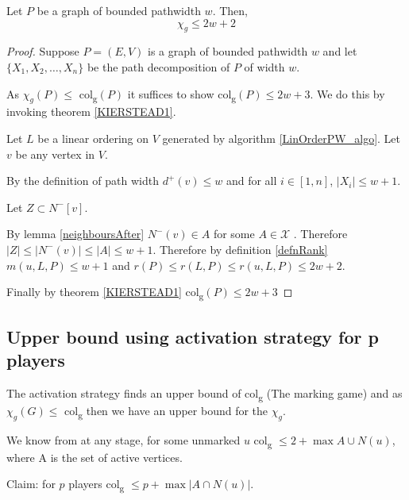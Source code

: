 \begin{theorem}
    Let $P$ be a graph of bounded pathwidth $w$. Then, 
    \[\chi_g \leq 2w + 2\]
    
\end{theorem}
\begin{proof}
    Suppose $P=(E,V)$ is a graph of bounded pathwidth $w$ and let $\{X_1,X_2,\dots,X_n\}$ be the path decomposition of $P$ of width $w$.
    
    As $\chi_g(P) \leq$ col\textsubscript{g}$(P)$ it suffices to show col\textsubscript{g}$(P) \leq 2w + 3$. We do this by invoking theorem \ref{KIERSTEAD1}.
        
    Let $L$ be a linear ordering on $V$ generated by algorithm \ref*{LinOrderPW_algo}. 
    Let $v$ be any vertex in $V$. 
    
    By the definition of path width $d^+(v) \leq w$ and for all $i \in [1,n]$, $ \left| X_i \right| \leq w + 1 $. 

    Let $Z\subset N^-[v]$.
    
    By lemma \ref{neighboursAfter} $N^-(v) \in A$ for some $A \in \mathcal{X}$ . Therefore$\left| Z\right| \leq \left| N^-(v)\right| \leq |A| \leq w+1$. Therefore by definition \ref{defnRank} $m(u,L,P) \leq w+1$ and $r(P) \leq r(L,P) \leq r(u,L,P) \leq 2w+2$. 
    
    Finally by theorem \ref{KIERSTEAD1} col\textsubscript{g}$(P) \leq 2w + 3$
    
\end{proof}

\subsection{Upper bound using activation strategy for p players}

The activation strategy finds an upper bound of col\textsubscript{g} (The marking game) and as $\chi_g(G) \leq$ col\textsubscript{g} then we have an upper bound for the $\chi_g$. 

We know from \cite{Zhu2008} at any stage, for some unmarked $u$ col\textsubscript{g} $\leq 2 + \max{A \cup N(u)}$, where A is the set of active vertices.

Claim: for $p$ players col\textsubscript{g} $\leq p + \max{ \left| A \cap N(u)\right| }$. 

